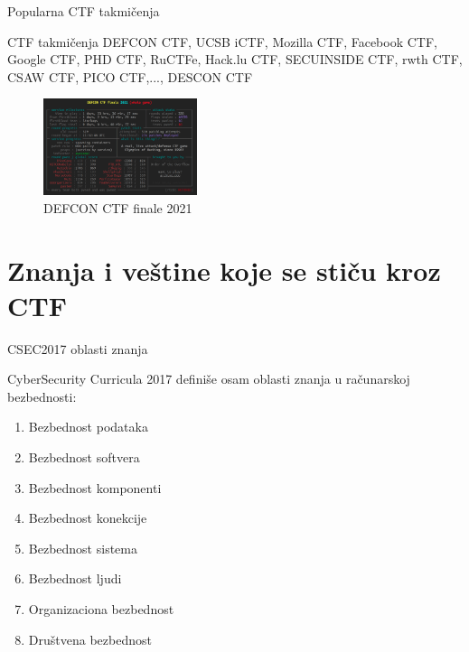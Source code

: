 \documentclass[aspectratio=169,xcolor=dvipsnames]{beamer}
\begin{document}

\begin{frame}{Popularna CTF takmičenja}

    \begin{exampleblock}{CTF takmičenja}
        DEFCON CTF, UCSB iCTF, Mozilla CTF, Facebook CTF, Google CTF, PHD CTF, 
        RuCTFe, Hack.lu CTF, SECUINSIDE CTF, rwth CTF, CSAW CTF, PICO CTF,...,
        DESCON CTF \cite{ctftime} \cite{ctfdescon}
    \end{exampleblock}

    \begin{figure}
        \begin{center}
            \includegraphics[width=0.4\textwidth]{Slike/ctf_comp.png}
        \end{center}
        \caption{DEFCON CTF finale 2021}
    \end{figure}

\end{frame}

\section{Znanja i veštine koje se stiču kroz CTF}

\begin{frame}{CSEC2017 oblasti znanja}

    \begin{block}{CyberSecurity Curricula 2017}
        \cite{ctfcsec17} definiše osam oblasti znanja u računarskoj bezbednosti:
        \begin{enumerate}
            \item Bezbednost podataka
            \item Bezbednost softvera 
            \item Bezbednost komponenti
            \item Bezbednost konekcije
            \item Bezbednost sistema
            \item Bezbednost ljudi
            \item Organizaciona bezbednost
            \item Društvena bezbednost
        \end{enumerate}
    \end{block}

\end{frame}
\end{document}
